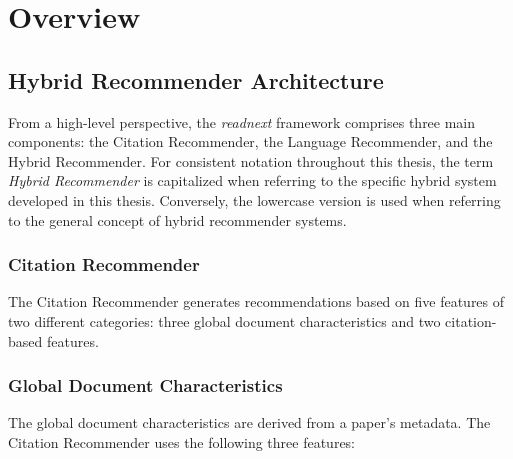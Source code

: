 \section{Overview} \label{sec:overview}

\subsection{Hybrid Recommender Architecture} \label{sec:hybrid-recommender-architecture}

From a high-level perspective, the \emph{readnext} framework comprises three main components: the Citation Recommender, the Language Recommender, and the Hybrid Recommender.
For consistent notation throughout this thesis, the term \emph{Hybrid Recommender} is capitalized when referring to the specific hybrid system developed in this thesis. Conversely, the lowercase version is used when referring to the general concept of hybrid recommender systems.


\subsubsection*{Citation Recommender}

The Citation Recommender generates recommendations based on five features of two different categories: three global document characteristics and two citation-based features.


\subsubsection*{Global Document Characteristics}

The global document characteristics are derived from a paper's metadata. The Citation Recommender uses the following three features:

